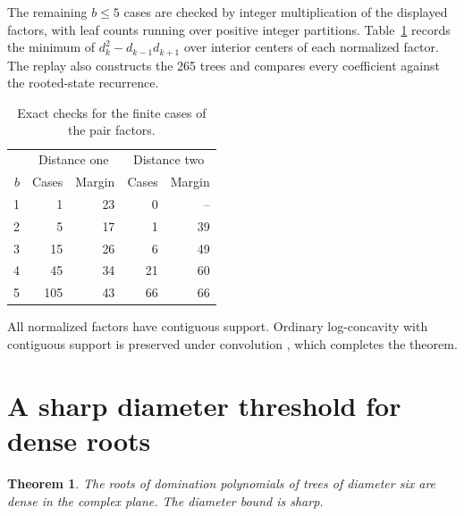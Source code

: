 \documentclass[10pt]{article}
\newtheorem{theorem}{Theorem}
\begin{document}
The remaining \(b\le5\) cases are checked by integer multiplication
of the displayed factors, with leaf counts running over positive
integer partitions. Table~\ref{tab:finite} records the minimum of
\(d_k^2-d_{k-1}d_{k+1}\) over interior centers of each normalized
factor. The replay also constructs the 265 trees and compares every
coefficient against the rooted-state recurrence.
\begin{table}[h]
\centering
\begin{tabular}{@{}rrrrr@{}}
\toprule
& \multicolumn{2}{c}{Distance one} & \multicolumn{2}{c}{Distance two}\\
\(b\) & Cases & Margin & Cases & Margin\\
\midrule
1&1&23&0&--\\
2&5&17&1&39\\
3&15&26&6&49\\
4&45&34&21&60\\
5&105&43&66&66\\
\bottomrule
\end{tabular}
\caption{Exact checks for the finite cases of the pair factors.}
\label{tab:finite}
\end{table}

All normalized factors have contiguous support. Ordinary log-concavity
with contiguous support is preserved under convolution \cite{liggett},
which completes the theorem.

\section{A sharp diameter threshold for dense roots}

\begin{theorem}
The roots of domination polynomials of trees of diameter six are
dense in the complex plane. The diameter bound is sharp.
\end{theorem}
\end{document}
